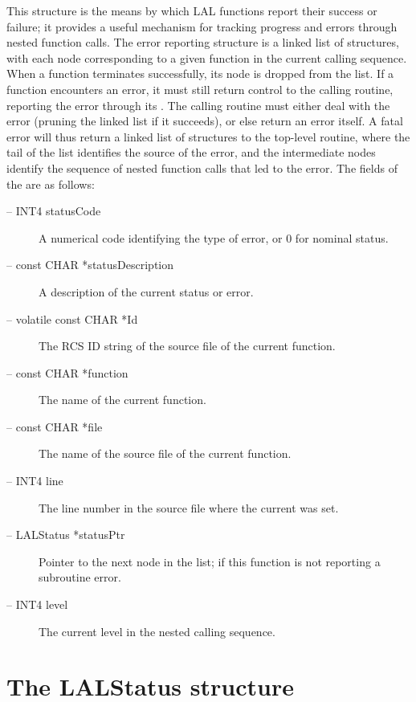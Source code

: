\documentclass[10pt]{ligodcc}
\renewcommand{\texttt}[1]{{\ttfamily\color{blue}#1}}
\begin{document}
This structure is the means by which LAL functions report their
success or failure; it provides a useful mechanism for tracking
progress and errors through nested function calls.  The error
reporting structure is a linked list of \verb@LALStatus@ structures, with
each node corresponding to a given function in the current calling
sequence.  When a function terminates successfully, its node is
dropped from the list.  If a function encounters an error, it must
still return control to the calling routine, reporting the error
through its \verb@LALStatus@.  The calling routine must either deal with
the error (pruning the linked list if it succeeds), or else return an
error itself.  A fatal error will thus return a linked list of
\verb@LALStatus@ structures to the top-level routine, where the tail of
the list identifies the source of the error, and the intermediate
nodes identify the sequence of nested function calls that led to the
error.  The fields of the \verb@LALStatus@ are as follows:
\begin{description}
\item[-- \texttt{INT4 statusCode}] A numerical code identifying the type
of error, or 0 for nominal status.
\item[-- \texttt{const CHAR *statusDescription}] A description of the
current status or error.
\item[-- \texttt{volatile const CHAR *Id}] The RCS ID string of the
source file of the current function.
\item[-- \texttt{const CHAR *function}] The name of the current function.
\item[-- \texttt{const CHAR *file}] The name of the source file of the
current function.
\item[-- \texttt{INT4 line}] The line number in the source file where the
current \verb@statusCode@ was set.
\item[-- \texttt{LALStatus *statusPtr}] Pointer to the next node in the
list; \verb@NULL@ if this function is not reporting a subroutine
error.
\item[-- \texttt{INT4 level}] The current level in the nested calling
sequence.
\end{description}


\section{The \texttt{LALStatus} structure}
\end{document}
